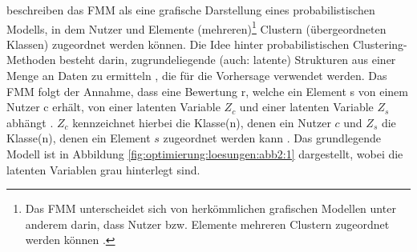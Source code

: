 \textcite[S. 358]{jin:article} beschreiben das \ac{FMM} als eine grafische Darstellung eines probabilistischen Modells, in dem Nutzer und Elemente (mehreren)\footnote{Das \ac{FMM} unterscheidet sich von herkömmlichen grafischen Modellen unter anderem darin, dass Nutzer bzw. Elemente mehreren Clustern zugeordnet werden können \cite[S. 3]{si:inproceedings}\cite[S. 366]{jin:article}.} Clustern (übergeordneten Klassen) zugeordnet werden können.
Die Idee hinter probabilistischen Clustering-Methoden besteht darin, zugrundeliegende (auch: latente) Strukturen aus einer Menge an Daten zu ermitteln \cite[S. 197]{truyen:inproceedings}, die für die Vorhersage verwendet werden.
Das \ac{FMM} folgt der Annahme, dass eine Bewertung r, welche ein Element s von einem Nutzer c erhält, von einer latenten Variable $Z_{c}$ und einer latenten Variable $Z_{s}$ abhängt \cite[S. 235]{sahoo:article}.
$Z_{c}$ kennzeichnet hierbei die Klasse(n), denen ein Nutzer $c$ und ${Z_{s}}$ die Klasse(n), denen ein Element $s$ zugeordnet werden kann \cite[S. 862]{adomavicius:4:inbook}\cite[S. 3]{si:inproceedings}.
Das grundlegende Modell ist in Abbildung \ref{fig:optimierung:loesungen:abb2:1} dargestellt, wobei die latenten Variablen grau hinterlegt sind.

